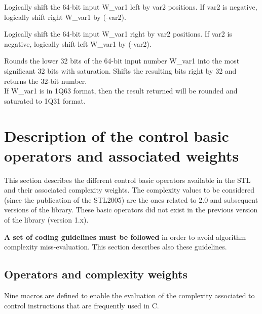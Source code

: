 Logically shift the 64-bit input W\_var1 left by var2 positions.
If var2 is negative, logically shift right W\_var1 by (-var2).


Logically shift the 64-bit input W\_var1 right by var2 positions. 
If var2 is negative, logically shift left W\_var1 by (-var2).


Rounds the lower 32 bits of the 64-bit input number W\_var1 into the most significant 32 bits with saturation. 
Shifts the resulting bits right by 32 and returns the 32-bit number.\\
If W\_var1 is in 1Q63 format, then the result returned will be rounded and saturated to 1Q31 format.




\section{Description of the control basic operators and associated weights}

This section describes the different control basic operators
available in the STL and their associated complexity weights. The
complexity values to be considered (since the publication of the
STL2005) are the ones related to 2.0 and subsequent versions of the library.
These basic operators did not exist in the previous version of the
library (version 1.x).

\textbf{A set of coding guidelines must be followed} in order to
avoid algorithm complexity miss-evaluation. This section describes
also these guidelines.

\subsection{Operators and complexity weights}
Nine macros are defined to enable the evaluation of the complexity
associated to control instructions that are frequently used in C.

